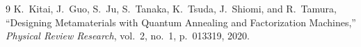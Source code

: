 \documentclass[11pt,a4paper]{ltjsarticle}
\begin{document}
\begin{thebibliography}{9}
K.~Kitai, J.~Guo, S.~Ju, S.~Tanaka, K.~Tsuda, J.~Shiomi, and R.~Tamura,
``Designing Metamaterials with Quantum Annealing and Factorization Machines,''
\textit{Physical Review Research}, vol.~2, no.~1, p.~013319, 2020.
\end{thebibliography}
\end{document}
